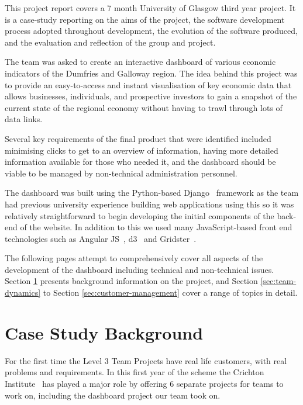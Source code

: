 \documentclass{l3proj}
\begin{document}
This project report covers a 7 month University of Glasgow third year project. It is a case-study reporting on the aims of the project, the software development process adopted throughout development, the evolution of the software produced, and the evaluation and reflection of the group and project.

The team was asked to create an interactive dashboard of various economic indicators of the Dumfries and Galloway region. The idea behind this project was to provide an easy-to-access and instant visualisation of key economic data that allows businesses, individuals, and prospective investors to gain a snapshot of the current state of the regional economy without having to trawl through lots of data links.

Several key requirements of the final product that were identified included minimising clicks to get to an overview of information, having more detailed information available for those who needed it, and the dashboard should be viable to be managed by non-technical administration personnel.

The dashboard was built using the Python-based Django~\cite{Django} framework as the team had previous university experience building web applications using this so it was relatively straightforward to begin developing the initial components of the back-end of the website. In addition to this we used many JavaScript-based front end technologies such as Angular JS~\cite{AngularWebpage}, d3~\cite{d3Webpage} and Gridster~\cite{AngularGridster}.

The following pages attempt to comprehensively cover all aspects of the development of the dashboard including technical and non-technical issues. Section \ref{sec:background} presents background information on the project, and Section \ref{sec:team-dynamics} to Section \ref{sec:customer-management} cover a range of topics in detail.

\section{Case Study Background}
\label{sec:background}

For the first time the Level 3 Team Projects have real life customers, with real problems and requirements. In this first year of the scheme the Crichton Institute~\cite{CrichtonInstitute} has played a major role by offering 6 separate projects for teams to work on, including the dashboard project our team took on.
\end{document}

